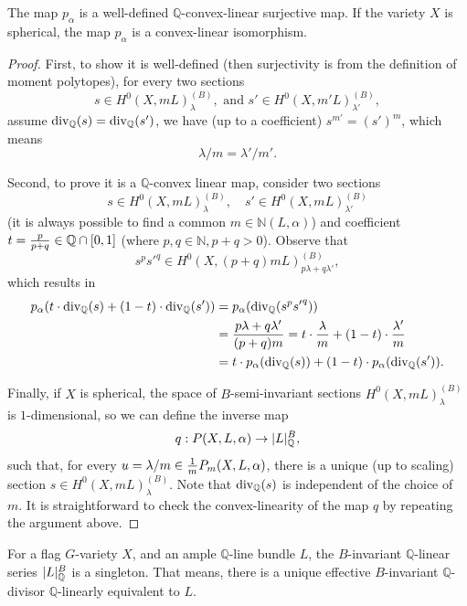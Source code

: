 \begin{proposition}
	The map $p_\alpha$ is a well-defined $\mathbb{Q}$-convex-linear surjective map. If the variety $X$ is spherical, the map $p_\alpha$ is a convex-linear isomorphism.
\end{proposition}
\begin{proof}
	First, to show it is well-defined (then surjectivity is from the definition of moment polytopes), for every two sections
	\begin{equation*}
		s \in H^0(X, m L)^{(B)}_\lambda, \text{ and } s' \in H^0(X, m' L)^{(B)}_{\lambda'},
	\end{equation*}
	assume $\mathrm{div}_\mathbb{Q}(s) = \mathrm{div}_\mathbb{Q}(s')$, we have (up to a coefficient) $s^{m'} = (s')^m$, which means
	\begin{equation*}
		\lambda / m = \lambda' / m' .
	\end{equation*}
	
	Second, to prove it is a $\mathbb{Q}$-convex linear map, consider two sections
	\begin{equation*}
		s \in H^0(X, m L)^{(B)}_\lambda, \quad s' \in H^0(X, m L)^{(B)}_{\lambda'}
	\end{equation*}
	(it is always possible to find a common $m \in \mathbb{N}(L, \alpha)$) and coefficient $t = {p \over p + q} \in \mathbb{Q} \cap [0, 1]$ (where $p, q \in \mathbb{N}, p + q > 0$). Observe that
	\begin{equation*}
		s^p {s'}^q \in H^0(X, (p + q) m L)^{(B)}_{p \lambda + q \lambda'},
	\end{equation*}
	which results in
	\begin{equation*}
	\begin{aligned}
		p_\alpha(t \cdot \divQ(s) + (1 - t) \cdot \divQ(s')) &= p_\alpha(\divQ(s^p {s'}^q)) \\
		&= {p \lambda + q \lambda' \over (p + q) m} = t \cdot {\lambda \over m} + (1 - t) \cdot {\lambda' \over m} \\
		&= t \cdot p_\alpha(\divQ(s)) + (1 - t) \cdot p_\alpha(\divQ(s')).
	\end{aligned}
	\end{equation*}

	Finally, if $X$ is spherical, the space of $B$-semi-invariant sections $H^0(X, m L)^{(B)}_\lambda$ is $1$-dimensional, so we can define the inverse map 
	\begin{equation*}
		q : P(X, L, \alpha) \to \mathopen{}\left|L\right|\mathclose{}_\mathbb{Q}^B ,
	\end{equation*}
	such that, for every $u = \lambda / m \in {1 \over m} P_m(X, L, \alpha)$, there is a unique (up to scaling) section $s \in H^0(X, m L)^{(B)}_\lambda$. Note that $\mathrm{div}_\mathbb{Q}(s)$ is independent of the choice of $m$. It is straightforward to check the convex-linearity of the map $q$ by repeating the argument above.
\end{proof}

\begin{example}
	For a flag $G$-variety $X$, and an ample $\mathbb{Q}$-line bundle $L$, the $B$-invariant $\mathbb{Q}$-linear series $\mathopen{}\left|L\right|\mathclose{}_\mathbb{Q}^B$ is a singleton. That means, there is a unique effective $B$-invariant $\mathbb{Q}$-divisor $\mathbb{Q}$-linearly equivalent to $L$.
\end{example}